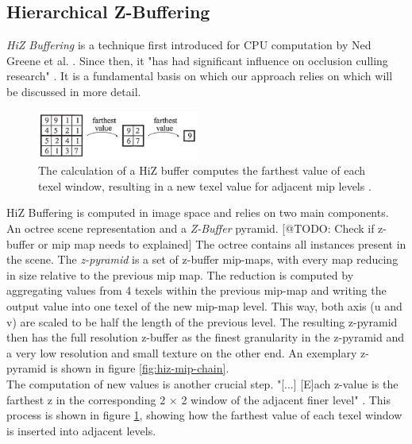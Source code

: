 \subsection{Hierarchical Z-Buffering} \label{subsec-hierarchical-z-buffering}

\emph{\ac{HiZ} Buffering} is a technique first introduced for \ac{CPU} computation by Ned Greene et al. 
\cite{Greene93,Greene95}. Since then, it "has had significant influence on occlusion culling research" 
\cite{AkenineMoeller2018}. It is a fundamental basis on which our approach relies on which will be discussed in more detail.\\

\begin{figure}[h]
    \centering
    \includegraphics[width=200px]{images/graphics/hiz-buf-values.png}
    \caption{The calculation of a \ac{HiZ} buffer computes the farthest value of each texel window, 
    resulting in a new texel value for adjacent mip levels \cite{AkenineMoeller2018}.}
    \label{fig:hiz-value-computation}
\end{figure}

\noindent
\ac{HiZ} Buffering is computed in image space and relies on two main components. An octree scene representation and a 
\emph{Z-Buffer} pyramid. [@TODO: Check if z-buffer or mip map needs to explained] 
The octree contains all instances present in the scene. The \emph{z-pyramid} is a set of z-buffer mip-maps, with every 
map reducing in size relative to the previous mip map. The reduction is computed by aggregating values from 4 texels 
within the previous mip-map and writing the output value into one texel of the new mip-map level. This way, both axis 
(u and v) are scaled to be half the length of the previous level. The resulting z-pyramid then has the full resolution 
z-buffer as the finest granularity in the z-pyramid and a very low resolution and small texture on the other end. 
An exemplary z-pyramid is shown in figure \ref{fig:hiz-mip-chain}.\\

\noindent
The computation of new values is another crucial step. "[...] [E]ach z-value is the farthest z in the corresponding 
2 \begin{math}\times\end{math} 2 window of the adjacent finer level" \cite{AkenineMoeller2018}. This process is shown 
in figure \ref{fig:hiz-value-computation}, showing how the farthest value of each texel window is inserted into adjacent 
levels.\\

